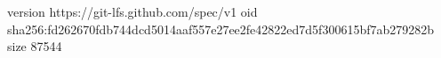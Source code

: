 version https://git-lfs.github.com/spec/v1
oid sha256:fd262670fdb744dcd5014aaf557e27ee2fe42822ed7d5f300615bf7ab279282b
size 87544
